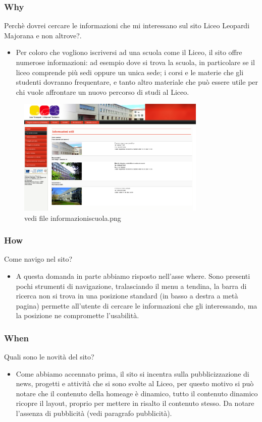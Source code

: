 \documentclass[12pt]{article}
\begin{document}
\newpage
\subsubsection{Why} Perch\`e dovrei cercare le informazioni che mi interessano sul sito Liceo Leopardi Majorana e non altrove?. 
\begin{itemize}
\item Per coloro che vogliono iscriversi ad una scuola come il Liceo, il sito offre numerose informazioni:
ad esempio dove si trova la scuola, in particolare se il liceo comprende pi\`u sedi oppure un unica sede; i corsi e le materie che gli studenti dovranno frequentare, e tanto altro materiale che pu\`o essere utile per chi vuole affrontare un nuovo percorso di studi al Liceo.
\end{itemize}
\begin{figure}[ht!]
\centering
\includegraphics[width=90mm]{informazioniscuola}
\caption{vedi file informazioniscuola.png}
\end{figure} 


\subsubsection{How} Come navigo nel sito?
\begin{itemize}

\item A questa domanda in parte abbiamo risposto nell'asse where.
Sono presenti pochi strumenti di navigazione, tralasciando il menu a tendina, la barra di ricerca non si trova in una posizione standard (in basso a destra a met\`a pagina) permette all'utente di cercare le informazioni che gli interessando, ma la posizione ne compromette l'usabilit\`a.
\end{itemize}

\subsubsection{When} Quali sono le novit\`a del sito?
\begin{itemize}

\item Come abbiamo accennato prima, il sito si incentra sulla pubblicizzazione di news, progetti e attivit\`a che si sono svolte al Liceo, per questo motivo si pu\`o notare che il contenuto della homeage \`e dinamico, tutto il contenuto dinamico ricopre il layout, proprio per mettere in risalto il contenuto stesso. Da notare l'assenza di pubblicit\`a (vedi paragrafo pubblicit\`a). 
\end{itemize}
\end{document}
